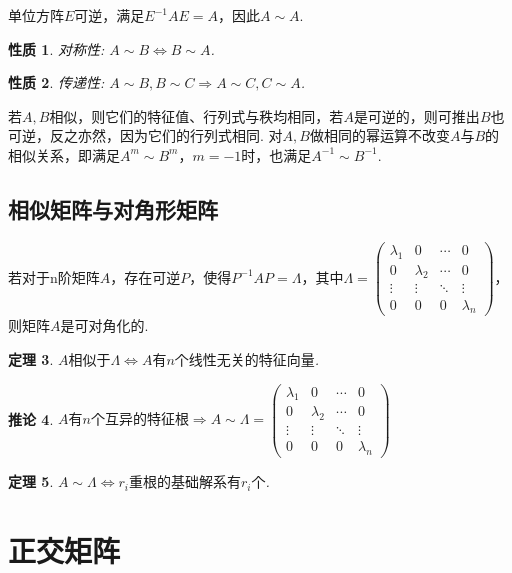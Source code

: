 \documentclass[12pt, a4paper, oneside]{ctexbook}
\newtheorem{theorem}{定理}[section]
\newtheorem{corollary}[theorem]{推论}
\newtheorem{quolity}[theorem]{性质}
\begin{document}
单位方阵$E$可逆，满足$E^{-1}AE=A$，因此$A \sim A$. 

\begin{quolity}
    对称性: $A \sim B \Leftrightarrow B \sim A$. 
\end{quolity}

\begin{quolity}
    传递性: $A \sim B, B \sim C \Rightarrow A \sim C, C \sim A$. 
\end{quolity}

若$A,B$相似，则它们的特征值、行列式与秩均相同，若$A$是可逆的，则可推出$B$也可逆，反之亦然，因为它们的行列式相同. 
对$A,B$做相同的幂运算不改变$A$与$B$的相似关系，即满足$A^m \sim B^m$，$m=-1$时，也满足$A^{-1} \sim B^{-1}$. 

\subsection{相似矩阵与对角形矩阵}

若对于n阶矩阵$A$，存在可逆$P$，使得$P^{-1}AP = \Lambda$，其中$\Lambda=\begin{pmatrix}
    \lambda_1 & 0 & \cdots & 0 \\
    0 & \lambda_2 & \cdots & 0 \\
    \vdots & \vdots & \ddots & \vdots \\
    0 & 0 & 0 & \lambda_n
\end{pmatrix}$，则矩阵$A$是可对角化的. 

\begin{theorem}
    $A\mbox{相似于}\Lambda \Leftrightarrow \mbox{$A$有$n$个线性无关的特征向量}$. 
\end{theorem}

\begin{corollary}
    $A \mbox{有} n \mbox{个互异的特征根} \Rightarrow A \sim \Lambda = \begin{pmatrix}
        \lambda_1 & 0 & \cdots & 0 \\
        0 & \lambda_2 & \cdots & 0 \\
        \vdots & \vdots & \ddots & \vdots \\
        0 & 0 & 0 & \lambda_n
    \end{pmatrix}$
\end{corollary}

\begin{theorem}
    $A \sim \Lambda \Leftrightarrow r_i \mbox{重根的基础解系有} r_i \mbox{个}$. 
\end{theorem}

\section{正交矩阵}
\end{document}
